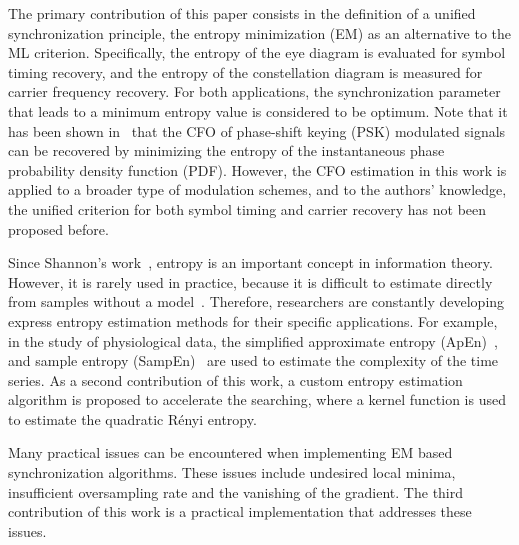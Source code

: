 \documentclass[12pt, draftclsnofoot, onecolumn]{IEEEtran}
\begin{document}
The primary contribution of this paper consists in the definition of a unified synchronization principle, the entropy minimization (EM) as an alternative to the ML criterion. 
Specifically, the entropy of the eye diagram is evaluated for symbol timing recovery, and the entropy of the constellation diagram is measured for carrier frequency recovery.
For both applications, the synchronization parameter that leads to a minimum entropy value is considered to be optimum.
Note that it has been shown in~\cite{Pedzisz2006} that the CFO of phase-shift keying (PSK) modulated signals can be recovered by minimizing the entropy of the instantaneous phase probability density function (PDF).
However, the CFO estimation in this work is applied to a broader type of modulation schemes, and to the authors' knowledge, the unified criterion for both symbol timing and carrier recovery has not been proposed before. 

Since Shannon's work~\cite{Shannon1948}, entropy is an important concept in information theory. 
However, it is rarely used in practice, because it is difficult to estimate directly from samples without a model~\cite{Bercher2000}.
Therefore, researchers are constantly developing express entropy estimation methods for their specific applications.
For example, in the study of physiological data, the simplified approximate entropy (ApEn)~\cite{Pincus1991}, and sample entropy (SampEn)~\cite{Richman2000} are used to estimate the complexity of the time series.
As a second contribution of this work, a custom entropy estimation algorithm is proposed to accelerate the searching,
where a kernel function is used to estimate the quadratic R\'enyi entropy.

Many practical issues can be encountered when implementing EM based synchronization algorithms.
These issues include undesired local minima, insufficient oversampling rate and the vanishing of the gradient.
The third contribution of this work is a practical implementation that addresses these issues.
\end{document}
